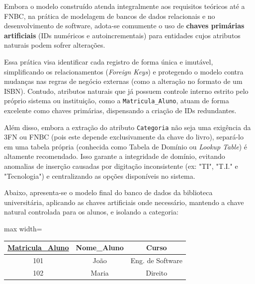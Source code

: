 Embora o modelo construído atenda integralmente aos requisitos teóricos até a FNBC, na prática de modelagem de bancos de dados relacionais e no desenvolvimento de software, adota-se comumente o uso de \textbf{chaves primárias artificiais} (IDs numéricos e autoincrementais) para entidades cujos atributos naturais podem sofrer alterações. 

Essa prática visa identificar cada registro de forma única e imutável, simplificando os relacionamentos (\textit{Foreign Keys}) e protegendo o modelo contra mudanças nas regras de negócio externas (como a alteração no formato de um ISBN). Contudo, atributos naturais que já possuem controle interno estrito pelo próprio sistema ou instituição, como a \texttt{Matricula\_Aluno}, atuam de forma excelente como chaves primárias, dispensando a criação de IDs redundantes.

Além disso, embora a extração do atributo \texttt{Categoria} não seja uma exigência da 3FN ou FNBC (pois este depende exclusivamente da chave do livro), separá-lo em uma tabela própria (conhecida como Tabela de Domínio ou \textit{Lookup Table}) é altamente recomendado. Isso garante a integridade de domínio, evitando anomalias de inserção causadas por digitação inconsistente (ex: "TI", "T.I." e "Tecnologia") e centralizando as opções disponíveis no sistema.

Abaixo, apresenta-se o modelo final do banco de dados da biblioteca universitária, aplicando as chaves artificiais onde necessário, mantendo a chave natural controlada para os alunos, e isolando a categoria:

\vspace{0.4cm}

\centering
\renewcommand{\arraystretch}{1.2}

\begin{adjustbox}{max width=\textwidth}
\begin{tabular}{|c|c|c|}
\hline
\textbf{\underline{Matricula\_Aluno}} & Nome\_Aluno & Curso \\ \hline
101 & João & Eng. de Software \\ \hline
102 & Maria & Direito \\ \hline
\end{tabular}
\end{adjustbox}

\vspace{0.3cm}

\vspace{0.5cm}

